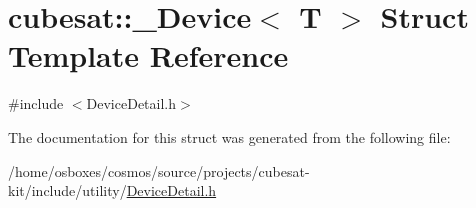 \hypertarget{structcubesat_1_1__Device}{}\section{cubesat\+:\+:\+\_\+\+Device$<$ T $>$ Struct Template Reference}
\label{structcubesat_1_1__Device}


{\ttfamily \#include $<$Device\+Detail.\+h$>$}



The documentation for this struct was generated from the following file\+:\begin{DoxyCompactItemize}
\item 
/home/osboxes/cosmos/source/projects/cubesat-\/kit/include/utility/\hyperlink{DeviceDetail_8h}{Device\+Detail.\+h}\end{DoxyCompactItemize}
